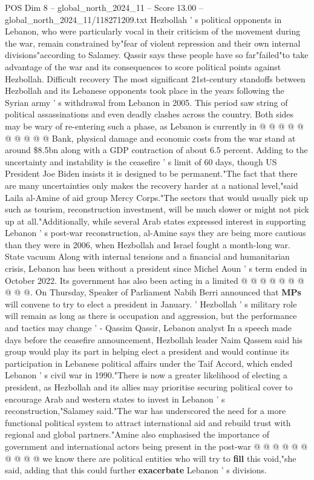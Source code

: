 \begin{textsample}{POS Dim 8 – global\_north\_2024\_11 – Score 13.00 – global\_north\_2024\_11/118271209.txt}
Hezbollah ' s political opponents in Lebanon, who were particularly vocal in their criticism of the movement during the war, remain constrained by"fear of violent repression and their own internal divisions"according to Salamey.
Qassir says these people have so far"failed"to take advantage of the war and its consequences to score political points against Hezbollah.
Difficult recovery The most significant 21st-century standoffs between Hezbollah and its Lebanese opponents took place in the years following the Syrian army ' s withdrawal from Lebanon in 2005.
This period saw string of political assassinations and even deadly clashes across the country.
Both sides may be wary of re-entering such a phase, as Lebanon is currently in @ @ @ @ @ @ @ @ @ @ Bank, physical damage and economic costs from the war stand at around \$8.5bn along with a GDP contraction of about 6.5 percent.
Adding to the uncertainty and instability is the ceasefire ' s limit of 60 days, though US President Joe Biden insists it is designed to be permanent."The fact that there are many uncertainties only makes the recovery harder at a national level,"said Laila al-Amine of aid group Mercy Corps."The sectors that would usually pick up such as tourism, reconstruction investment, will be much slower or might not pick up at all."Additionally, while several Arab states expressed interest in supporting Lebanon ' s post-war reconstruction, al-Amine says they are being more cautious than they were in 2006, when Hezbollah and Israel fought a month-long war.
State vacuum Along with internal tensions and a financial and humanitarian crisis, Lebanon has been without a president since Michel Aoun ' s term ended in October 2022.
Its government has also been acting in a limited @ @ @ @ @ @ @ @ @ @.
On Thursday, Speaker of Parliament Nabih Berri announced that \textbf{MPs} will convene to try to elect a president in January. ' Hezbollah ' s military role will remain as long as there is occupation and aggression, but the performance and tactics may change ' - Qassim Qassir, Lebanon analyst In a speech made days before the ceasefire announcement, Hezbollah leader Naim Qassem said his group would play its part in helping elect a president and would continue its participation in Lebanese political affairs under the Taif Accord, which ended Lebanon ' s civil war in 1990."There is now a greater likelihood of electing a president, as Hezbollah and its allies may prioritise securing political cover to encourage Arab and western states to invest in Lebanon ' s reconstruction,"Salamey said."The war has underscored the need for a more functional political system to attract international aid and rebuild trust with regional and global partners."Amine also emphasised the importance of government and international actors being present in the post-war @ @ @ @ @ @ @ @ @ @ we know there are political entities who will try to \textbf{fill} this void,"she said, adding that this could further \textbf{exacerbate} Lebanon ' s divisions.

\end{textsample}
